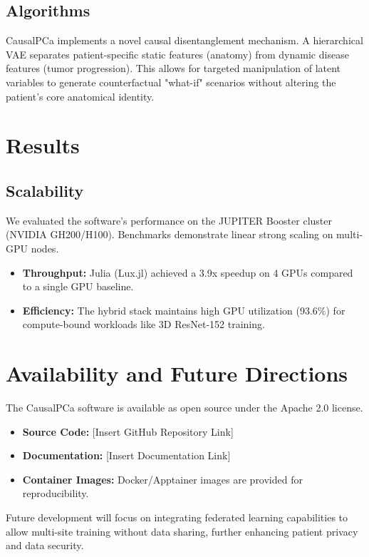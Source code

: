 \documentclass[10pt,letterpaper]{article}
\begin{document}
\subsection*{Algorithms}
CausalPCa implements a novel causal disentanglement mechanism. A hierarchical VAE separates patient-specific static features (anatomy) from dynamic disease features (tumor progression). This allows for targeted manipulation of latent variables to generate counterfactual "what-if" scenarios without altering the patient's core anatomical identity.

\section*{Results}

\subsection*{Scalability}
We evaluated the software's performance on the JUPITER Booster cluster (NVIDIA GH200/H100). Benchmarks demonstrate linear strong scaling on multi-GPU nodes.
\begin{itemize}
    \item \textbf{Throughput:} Julia (Lux.jl) achieved a 3.9x speedup on 4 GPUs compared to a single GPU baseline.
    \item \textbf{Efficiency:} The hybrid stack maintains high GPU utilization (93.6\%) for compute-bound workloads like 3D ResNet-152 training.
\end{itemize}

\section*{Availability and Future Directions}
The CausalPCa software is available as open source under the Apache 2.0 license.
\begin{itemize}
    \item \textbf{Source Code:} [Insert GitHub Repository Link]
    \item \textbf{Documentation:} [Insert Documentation Link]
    \item \textbf{Container Images:} Docker/Apptainer images are provided for reproducibility.
\end{itemize}

Future development will focus on integrating federated learning capabilities to allow multi-site training without data sharing, further enhancing patient privacy and data security.
\end{document}
